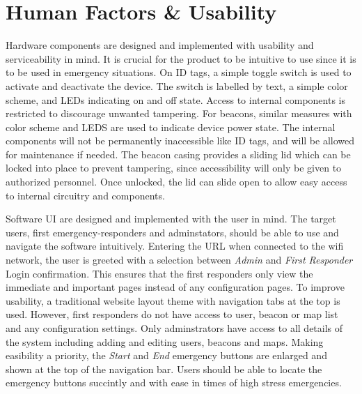 

\setcounter{section}{4}
\section{Human Factors \& Usability}

\bigskip
Hardware components are designed and implemented with usability and serviceability in mind. It is crucial for the product to be intuitive to use since it is to be used in emergency situations. On ID tags, a simple toggle switch is used to activate and deactivate the device. The switch is labelled by text, a simple color scheme, and LEDs indicating on and off state. Access to internal components is restricted to discourage unwanted tampering. For beacons, similar measures with color scheme and LEDS are used to indicate device power state. The internal components will not be permanently inaccessible like ID tags, and will be allowed for maintenance if needed. The beacon casing provides a sliding lid which can be locked into place to prevent tampering, since accessibility will only be given to authorized personnel.  Once unlocked, the lid can slide open to allow easy access to internal circuitry and components. 

\bigskip
Software UI are designed and implemented with the user in mind. The target users, first emergency-responders and adminstators, should be able to use and navigate the software intuitively. 
Entering the URL when connected to the wifi network, the user is greeted with a selection between \textit{Admin} and \textit{First Responder} Login confirmation. This ensures that the 
first responders only view the immediate and important pages instead of any configuration pages. To improve usability, a traditional website layout theme with navigation tabs at the top is used. 
However, first responders do not have access to user, beacon or map list and any configuration settings. Only adminstrators have access to all details of the system including adding and editing
users, beacons and maps. Making easibility a priority, the \textit{Start} and \textit{End} emergency buttons are enlarged and shown at the top of the navigation bar. Users should be able to locate 
the emergency buttons succintly and with ease in times of high stress emergencies.